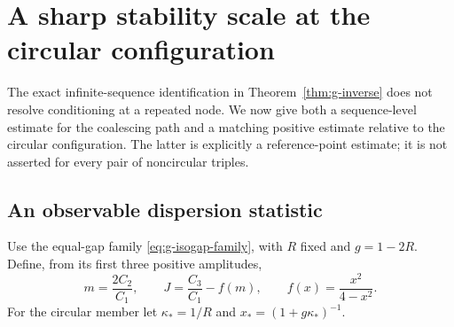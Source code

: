 \section{A sharp stability scale at the circular configuration}
\label{sec:v4-coalescence}
The exact infinite-sequence identification in
Theorem~\ref{thm:g-inverse} does not resolve conditioning at a repeated
node. We now give both a sequence-level estimate for the coalescing
path and a matching positive estimate relative to the circular
configuration. The latter is explicitly a reference-point estimate;
it is not asserted for every pair of noncircular triples.

\subsection{An observable dispersion statistic}
Use the equal-gap family \eqref{eq:g-isogap-family}, with $R$ fixed
and $g=1-2R$. Define, from its first three positive amplitudes,
\begin{equation}\label{eq:v4-dispersion-data}
 m=\frac{2C_2}{C_1},\qquad
 J=\frac{C_3}{C_1}-f(m),\qquad f(x)=\frac{x^2}{4-x^2}.
\end{equation}
For the circular member let
$\kappa_*=1/R$ and $x_*=(1+g\kappa_*)^{-1}$.

